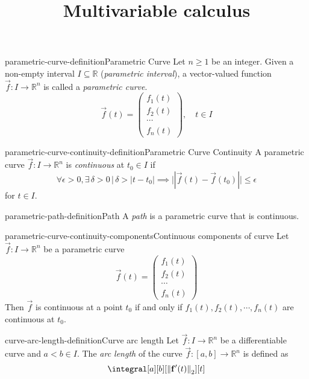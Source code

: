 \documentclass[preview]{standalone}
\begin{document}
\title{Multivariable calculus}
\genpage

\begin{snippetdefinition}{parametric-curve-definition}{Parametric Curve}
    Let \(n \geq 1\) be an integer.
    Given a non-empty interval \(I \subseteq \mathbb{R}\)
    (\textit{parametric interval}), a vector-valued function \(\vec{f}: I\to{\mathbb{R}}^n\)
    is called a \textit{parametric curve}.
    \[
        \vec{f}(t) = \begin{pmatrix}
                f_1(t) \\
                f_2(t) \\
                \cdots \\
                f_n(t)
        \end{pmatrix}, \quad t \in I
    \]
\end{snippetdefinition}

\begin{snippetdefinition}{parametric-curve-continuity-definition}{Parametric Curve Continuity}
    A parametric curve \(\vec{f}: I \to {\mathbb{R}}^n\)
    is \textit{continuous} at \(t_0 \in I\)
    if
    \[
        \forall \epsilon > 0, 
        \exists \, \delta > 0 \,|\, \delta > |t-t_0|
        \implies ||\vec{f}(t) - \vec{f}(t_0)|| \leq \epsilon
    \]
    for \(t \in I\).
\end{snippetdefinition}

\begin{snippetdefinition}{parametric-path-definition}{Path}
    A \textit{path} is a parametric curve
    that is continuous.
\end{snippetdefinition}

\begin{snippetproposition}{parametric-curve-continuity-components}{Continuous components of curve}
    Let \(\vec{f}: I \to {\mathbb{R}}^n\) be a parametric curve
    \[
        \vec{f}(t) = \begin{pmatrix}
                f_1(t) \\
                f_2(t) \\
                \cdots \\
                f_n(t)
        \end{pmatrix}
    \]
    Then \(\vec{f}\) is continuous at a point \(t_0\) if and only if
    \(f_1(t), f_2(t), \cdots, f_n(t)\) are continuous at \(t_0\).
\end{snippetproposition}

\begin{snippetdefinition}{curve-arc-length-definition}{Curve arc length}
    Let \(\vec{f}:I\to{\mathbb{R}}^n\) be a differentiable curve
    and \(a < b \in I\).
    The \textit{arc length} of the curve \(\vec{f}:[a,b] \to {\mathbb{R}}^n\)
    is defined as
    \[
        \integral[a][b][\left\|\mathbf{f}^{\prime}(t)\right\|_2][t]
    \]
\end{snippetdefinition}
\end{document}

